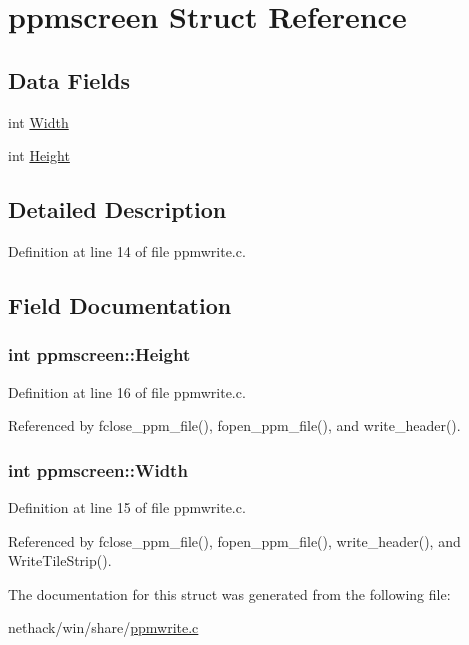 \hypertarget{structppmscreen}{\section{ppmscreen Struct Reference}
\label{structppmscreen}
}
\subsection*{Data Fields}
\begin{DoxyCompactItemize}
\item 
int \hyperlink{structppmscreen_ab6525342f57d9f8483b6b61568b8b3f0}{Width}
\item 
int \hyperlink{structppmscreen_a0a3f15b5465d631c70a8ed5a0346113f}{Height}
\end{DoxyCompactItemize}


\subsection{Detailed Description}


Definition at line 14 of file ppmwrite.\+c.



\subsection{Field Documentation}
\hypertarget{structppmscreen_a0a3f15b5465d631c70a8ed5a0346113f}{
\subsubsection[{Height}]{\setlength{\rightskip}{0pt plus 5cm}int ppmscreen\+::\+Height}}\label{structppmscreen_a0a3f15b5465d631c70a8ed5a0346113f}


Definition at line 16 of file ppmwrite.\+c.



Referenced by fclose\+\_\+ppm\+\_\+file(), fopen\+\_\+ppm\+\_\+file(), and write\+\_\+header().

\hypertarget{structppmscreen_ab6525342f57d9f8483b6b61568b8b3f0}{
\subsubsection[{Width}]{\setlength{\rightskip}{0pt plus 5cm}int ppmscreen\+::\+Width}}\label{structppmscreen_ab6525342f57d9f8483b6b61568b8b3f0}


Definition at line 15 of file ppmwrite.\+c.



Referenced by fclose\+\_\+ppm\+\_\+file(), fopen\+\_\+ppm\+\_\+file(), write\+\_\+header(), and Write\+Tile\+Strip().



The documentation for this struct was generated from the following file\+:\begin{DoxyCompactItemize}
\item 
nethack/win/share/\hyperlink{ppmwrite_8c}{ppmwrite.\+c}\end{DoxyCompactItemize}
